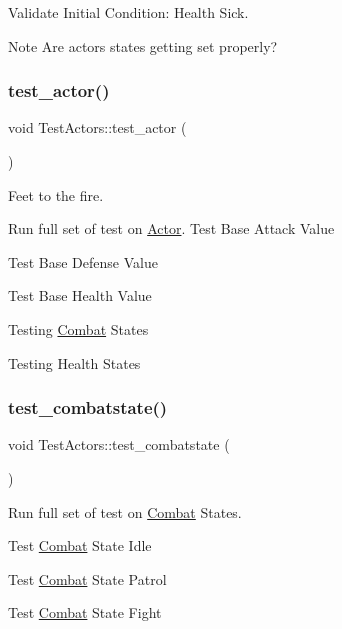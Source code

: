 Validate Initial Condition\+: Health Sick. 

\begin{DoxyNote}{Note}
Are actors states getting set properly? 
\end{DoxyNote}
\mbox{\label{classTestActors_a5b01d8e27e70d12bd2f373e22b8664cd}} 
\subsubsection{\texorpdfstring{test\+\_\+actor()}{test\_actor()}}
{\footnotesize\ttfamily void Test\+Actors\+::test\+\_\+actor (\begin{DoxyParamCaption}{ }\end{DoxyParamCaption})}



Feet to the fire. 

Run full set of test on \mbox{\hyperlink{classActor}{Actor}}. Test Base Attack Value

Test Base Defense Value

Test Base Health Value

Testing \mbox{\hyperlink{classCombat}{Combat}} States

Testing Health States \mbox{\label{classTestActors_ac601ed92d184d8a3a170f93235462d89}} 
\subsubsection{\texorpdfstring{test\+\_\+combatstate()}{test\_combatstate()}}
{\footnotesize\ttfamily void Test\+Actors\+::test\+\_\+combatstate (\begin{DoxyParamCaption}{ }\end{DoxyParamCaption})}



Run full set of test on \mbox{\hyperlink{classCombat}{Combat}} States. 

Test \mbox{\hyperlink{classCombat}{Combat}} State Idle

Test \mbox{\hyperlink{classCombat}{Combat}} State Patrol

Test \mbox{\hyperlink{classCombat}{Combat}} State Fight

